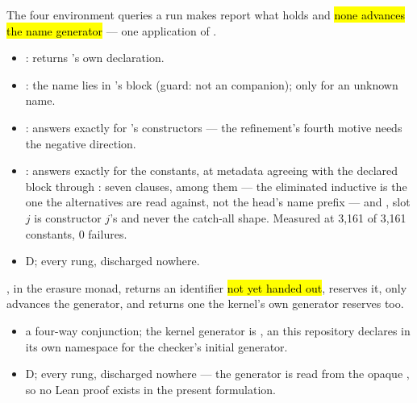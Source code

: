 \begin{assumption}
\label{asm:ErasureSpec-lookup_adequate}
\leanok
{}
\stAssumed{}  The four environment queries a run makes report what 
holds and \hl{none advances the name generator} --- one application of .
\begin{itemize}
\item {}:  returns 's own declaration.
\item {}: the name lies in 's block (guard: not an
 companion);  only for an unknown name.
\item {}:  answers exactly for 's constructors ---
the refinement's fourth motive needs the negative direction.
\item {}:  answers exactly for the  constants, at
metadata agreeing with the declared block through : seven clauses, among
them  --- the eliminated inductive is the one the alternatives are read against, not
the head's name prefix --- and , slot $j$ is constructor $j$'s and never the
catch-all shape. Measured at 3{,}161 of 3{,}161  constants, 0 failures.
\item {} D;  every rung, discharged nowhere.
\end{itemize}
\end{assumption}

\begin{assumption}
\label{asm:ErasureSpec-fresh_names}
\leanok
\stAssumed{}  , in the erasure monad, returns an
identifier \hl{not yet handed out}, reserves it, only advances the generator, and returns one the
kernel's own generator reserves too.
\begin{itemize}
\item {} a four-way conjunction; the kernel generator is , an
 this repository declares in its own namespace for the checker's initial generator.
\item {} D;  every rung, discharged nowhere --- the generator is read
from the opaque , so no Lean proof exists in the present formulation.
\end{itemize}
\end{assumption}

